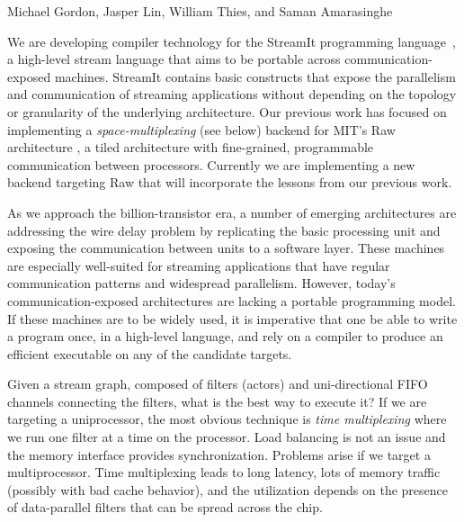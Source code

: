 \documentclass{csailabstractbook}
\begin{document}


         {Michael Gordon, Jasper Lin, William Thies, and Saman Amarasinghe}


We are developing compiler technology for the StreamIt programming
language~\cite{streamitcc}, a high-level stream language that aims to
be portable across communication-exposed machines.  StreamIt contains
basic constructs that expose the parallelism and communication of
streaming applications without depending on the topology or
granularity of the underlying architecture.  Our previous work
\cite{streamit-asplos} has focused on 
implementing a {\it space-multiplexing} (see below) backend for
MIT's Raw architecture \cite{raw}, a tiled architecture 
with fine-grained, programmable communication between processors.
Currently we are implementing a new backend targeting Raw that will
incorporate the lessons from our previous work.

As we approach the billion-transistor era, a number of emerging
architectures are addressing the wire delay problem by replicating the
basic processing unit and exposing the communication between units to
a software layer.  These machines are especially well-suited for
streaming applications that have regular communication patterns and
widespread parallelism.  However, today's communication-exposed
architectures are lacking a portable programming model.  If these
machines are to be widely used, it is imperative that one be able to
write a program once, in a high-level language, and rely on a compiler
to produce an efficient executable on any of the candidate targets.


Given a stream graph, composed of filters (actors) and uni-directional
FIFO channels connecting the filters, what is the best way to execute
it?  If we are targeting a uniprocessor, the most obvious technique is
{\it time multiplexing} where we run one filter at a time on the
processor.  Load balancing is not an issue and the memory interface
provides synchronization.  Problems arise if we target a
multiprocessor.  Time multiplexing leads to long latency, lots of
memory traffic (possibly with bad cache behavior), and the utilization
depends on the presence of data-parallel filters that can be spread
across the chip.
\end{document}
